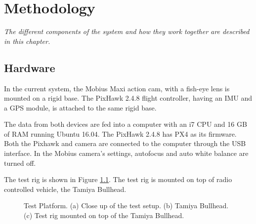 \setlength{\footskip}{8mm}

\chapter{Methodology}
\label{ch:methodology}

\textit{The different components of the system and how they work together are described in this chapter.}

\section{Hardware}

In the current system, the Mobius Maxi action cam, with a fish-eye lens is mounted on a rigid base. The PixHawk 2.4.8 flight controller, having an IMU and a GPS module, is attached to the same rigid base. 


The data from both devices are fed into a computer with an i7 CPU and 16 GB of RAM running Ubuntu 16.04. The PixHawk 2.4.8 has PX4 as its firmware. Both the Pixhawk and camera are connected to the computer through the USB interface. In the Mobius camera's settings, autofocus and auto white balance are turned off. 

The test rig is shown in Figure \ref{fig:rigsetup}. The test rig is mounted on top of radio controlled vehicle, the Tamiya Bullhead. 

\begin{figure}[htp]
	
	\centering
	\caption[Test platform.]{\small 
		Test Platform. (a) Close up of the test setup. (b) Tamiya Bullhead. (c) Test rig mounted on top of the Tamiya Bullhead.}
	\label{fig:rigsetup}
	
\end{figure}


